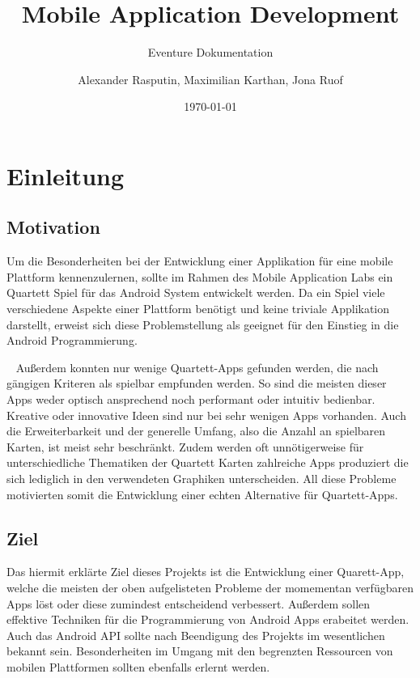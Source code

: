 \documentclass{scrartcl}
\title{Mobile Application Development}
\subtitle{Eventure Dokumentation}
\date{\today}
\author{Alexander Rasputin, Maximilian Karthan, Jona Ruof}
\begin{document}
\maketitle
\newpage
\tableofcontents

\section{Einleitung}
\subsection{Motivation}

Um die Besonderheiten bei der Entwicklung einer Applikation für eine mobile
Plattform kennenzulernen, sollte im Rahmen des Mobile Application Labs ein
Quartett Spiel für das Android System entwickelt werden. Da ein Spiel viele
verschiedene Aspekte einer Plattform benötigt und keine triviale Applikation
darstellt, erweist sich diese Problemstellung als geeignet für den Einstieg in
die Android Programmierung.

\ \newline
Außerdem konnten nur wenige Quartett-Apps gefunden werden, die nach gängigen
Kriteren als spielbar empfunden werden. So sind die meisten dieser Apps weder
optisch ansprechend noch performant oder intuitiv bedienbar. Kreative oder
innovative Ideen sind nur bei sehr wenigen Apps vorhanden. Auch die
Erweiterbarkeit und der generelle Umfang, also die Anzahl an spielbaren Karten,
ist meist sehr beschränkt. Zudem werden oft unnötigerweise für unterschiedliche
Thematiken der Quartett Karten zahlreiche Apps produziert die sich lediglich
in den verwendeten Graphiken unterscheiden. All diese Probleme motivierten somit
die Entwicklung einer echten Alternative für Quartett-Apps.

\subsection{Ziel}

Das hiermit erklärte Ziel dieses Projekts ist die Entwicklung einer Quarett-App,
welche die meisten der oben aufgelisteten Probleme der momementan verfügbaren
Apps löst oder diese zumindest entscheidend verbessert. Außerdem sollen
effektive Techniken für die Programmierung von Android Apps erabeitet werden.
Auch das Android API sollte nach Beendigung des Projekts im wesentlichen bekannt
sein. Besonderheiten im Umgang mit den begrenzten Ressourcen von mobilen
Plattformen sollten ebenfalls erlernt werden.
\end{document}
